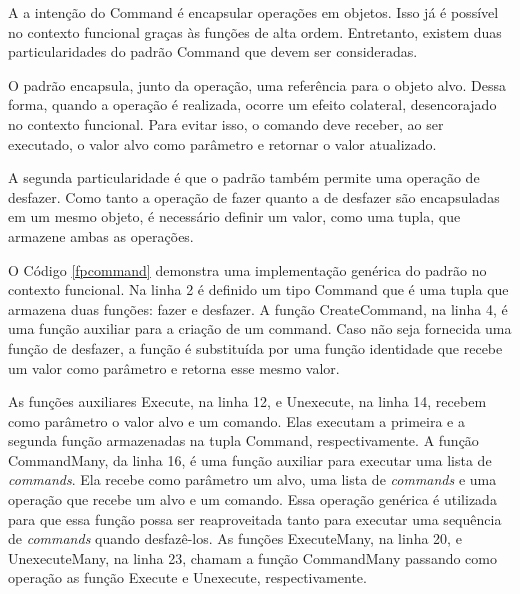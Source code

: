 A a intenção do Command é encapsular operações 
em objetos. Isso já é possível no contexto 
funcional graças às funções de alta ordem. 
Entretanto, existem duas particularidades 
do padrão Command que devem ser consideradas. 

O padrão encapsula, junto da operação, uma 
referência para o objeto alvo. Dessa forma, 
quando a operação é realizada, ocorre 
um efeito colateral, desencorajado 
no contexto funcional. Para evitar isso, o 
comando deve receber, ao ser executado, o 
valor alvo como parâmetro e retornar o 
valor atualizado.

A segunda particularidade é que o padrão 
também permite uma operação de desfazer. Como 
tanto a operação de fazer quanto a de desfazer 
são encapsuladas em um mesmo objeto, é necessário 
definir um valor, como uma tupla, que armazene ambas 
as operações.

O Código \ref{fpcommand} demonstra uma implementação 
genérica do padrão no contexto funcional. Na linha 2 
é definido um tipo Command que é uma tupla que 
armazena duas funções: fazer e desfazer. A função 
CreateCommand, na linha 4, é uma função auxiliar para 
a criação de um command. Caso não seja fornecida 
uma função de desfazer, a função é substituída por 
uma função identidade que recebe um valor como 
parâmetro e retorna esse mesmo valor.

As funções auxiliares Execute, na linha 12, e 
Unexecute, na linha 14, recebem como parâmetro o valor 
alvo e um comando. Elas executam a primeira e a 
segunda função armazenadas na tupla Command, 
respectivamente. A função CommandMany, da linha 16, 
é uma função auxiliar 
para executar uma lista de \textit{commands}. Ela recebe 
como parâmetro um alvo, uma lista de \textit{commands} e 
uma operação que recebe um alvo e um comando. Essa 
operação genérica é utilizada para que essa função 
possa ser reaproveitada tanto para executar uma 
sequência de \textit{commands} quando desfazê-los. 
As funções ExecuteMany, na linha 20, e UnexecuteMany, 
na linha 23, chamam a função CommandMany passando 
como operação as função Execute e Unexecute, 
respectivamente.


